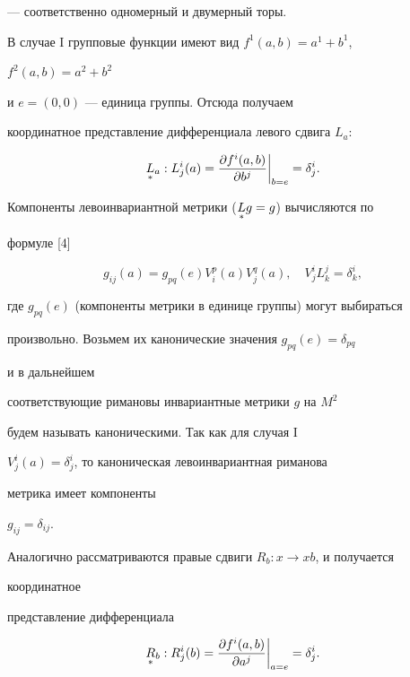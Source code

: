--- соответственно одномерный и двумерный торы. 


 


В случае I групповые функции имеют вид $f^1(a,b)=a^1+b^1$, 


$f^2(a,b)=a^2+b^2$ 


и $e=(0,0)$ --- единица группы. Отсюда получаем


координатное представление дифференциала левого сдвига $L_a$:


$$ 


\down{*}{L}_a:L^i_j(a)= 


\frac{\partial f^i(a,b)}{\partial b^j}\bigg|_{b=e}=\delta^i_j. 


$$ 


Компоненты левоинвариантной метрики ($\underset{*}{L}{}g=g$) вычисляются по 


формуле [4]


\begin{equation} 


g_{i j}(a)=g_{p q}(e)V^p_i(a)V^q_j(a),\quad 


V^i_j L^j_k=\delta^i_k, 


\end{equation} 


где $g_{p q}(e)$ (компоненты метрики в единице группы) могут выбираться 


произвольно. Возьмем их канонические значения $g_{p q}(e)=\delta_{p q}$ 


и в дальнейшем 


соответствующие римановы инвариантные метрики $g$ на $M^2$ 


будем называть каноническими. Так как для случая I 


$V^i_j(a)=\delta^i_j$, то каноническая левоинвариантная риманова 


метрика имеет компоненты 


$g_{i j}=\delta_{i j}$. 


 


Аналогично рассматриваются правые сдвиги $R_b:x\to x b$, и получается 


координатное 


представление дифференциала 


$$ 


\down{*}{R}_b:R^i_j(b)= 


\frac{\partial f^i(a,b)}{\partial a^j}\bigg|_{a=e}=\delta^i_j. 


$$ 



